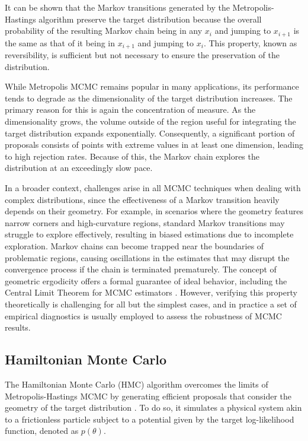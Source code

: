 It can be shown that the Markov transitions generated by the Metropolis-Hastings algorithm preserve the target
distribution because the overall probability of the resulting Markov chain being in any $x_i$ and jumping to $x_{i+1}$ is the same as that
of it being in $x_{i+1}$
and jumping to $x_i$. This property, known as reversibility, is sufficient but not necessary to ensure the
preservation of the distribution. 

While Metropolis MCMC remains popular in many applications, its performance tends to degrade as the dimensionality of
the target distribution increases. The primary reason for this is again the concentration of measure. As the dimensionality grows,
the volume outside of the region useful for integrating the target distribution expands exponentially. Consequently, a
significant portion of proposals consists of points with extreme values in at least one dimension, leading to high rejection rates. Because of this, the Markov chain explores the distribution at an exceedingly slow pace.

In a broader context, challenges arise in all MCMC techniques when dealing with complex distributions, since the
effectiveness of a Markov transition heavily depends on their geometry. For example, in scenarios where the geometry
features narrow corners and high-curvature regions, standard Markov transitions may struggle to explore effectively,
resulting in biased estimations due to incomplete exploration. Markov chains can become trapped near the boundaries of
problematic regions, causing oscillations in the estimates that may disrupt the convergence process if the chain is
terminated prematurely. The concept of geometric ergodicity offers a formal guarantee of ideal behavior, including the
Central Limit Theorem for MCMC estimators \cite{jarner2000geometric}. However, verifying this property theoretically is challenging for all but the simplest cases, and in practice a set of empirical diagnostics is usually employed to assess the robustness of MCMC results.

\subsection{Hamiltonian Monte Carlo}
The Hamiltonian Monte Carlo (HMC) algorithm overcomes the limits of Metropolis-Hastings MCMC by generating efficient
proposals that consider the geometry of the target distribution \cite{betancourt2017conceptual}. To do so, it simulates a physical system akin to a frictionless particle subject to a potential given by the target log-likelihood function, denoted as $p(\theta)$.

